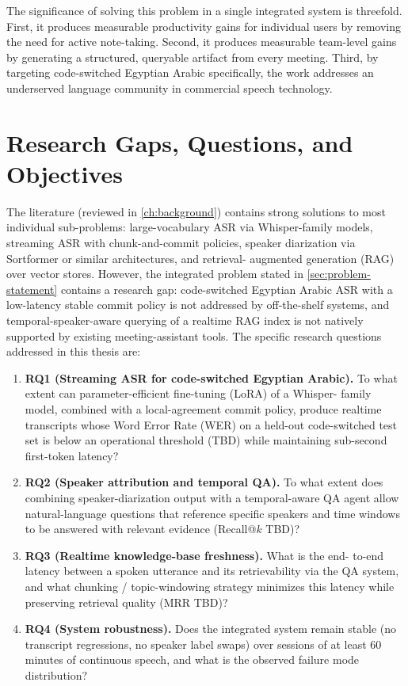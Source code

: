 The significance of solving this problem in a single integrated system is
threefold. First, it produces measurable productivity gains for individual
users by removing the need for active note-taking. Second, it produces
measurable team-level gains by generating a structured, queryable
artifact from every meeting. Third, by targeting code-switched Egyptian
Arabic specifically, the work addresses an underserved language community
in commercial speech technology.

\section{Research Gaps, Questions, and Objectives}
\label{sec:rqs}

The literature (reviewed in \cref{ch:background}) contains strong solutions
to most individual sub-problems: large-vocabulary ASR via Whisper-family
models, streaming ASR with chunk-and-commit policies, speaker
diarization via Sortformer or similar architectures, and retrieval-
augmented generation (RAG) over vector stores. However, the integrated
problem stated in \cref{sec:problem-statement} contains a research gap:
code-switched Egyptian Arabic ASR with a low-latency stable commit policy
is not addressed by off-the-shelf systems, and temporal-speaker-aware
querying of a realtime RAG index is not natively supported by existing
meeting-assistant tools. The specific research questions addressed in this
thesis are:

\begin{enumerate}[label=\textbf{RQ\arabic*.}, itemsep=0.4em]
  \item \textbf{RQ1 (Streaming ASR for code-switched Egyptian Arabic).} To
  what extent can parameter-efficient fine-tuning (LoRA) of a Whisper-
  family model, combined with a local-agreement commit policy, produce
  realtime transcripts whose Word Error Rate (WER) on a held-out
  code-switched test set is below an operational threshold (TBD) while
  maintaining sub-second first-token latency?
  \item \textbf{RQ2 (Speaker attribution and temporal QA).} To what extent
  does combining speaker-diarization output with a temporal-aware QA agent
  allow natural-language questions that reference specific speakers and
  time windows to be answered with relevant evidence (Recall@$k$ TBD)?
  \item \textbf{RQ3 (Realtime knowledge-base freshness).} What is the end-
  to-end latency between a spoken utterance and its retrievability via the
  QA system, and what chunking / topic-windowing strategy minimizes this
  latency while preserving retrieval quality (MRR TBD)?
  \item \textbf{RQ4 (System robustness).} Does the integrated system
  remain stable (no transcript regressions, no speaker label swaps) over
  sessions of at least 60 minutes of continuous speech, and what is the
  observed failure mode distribution?
\end{enumerate}

